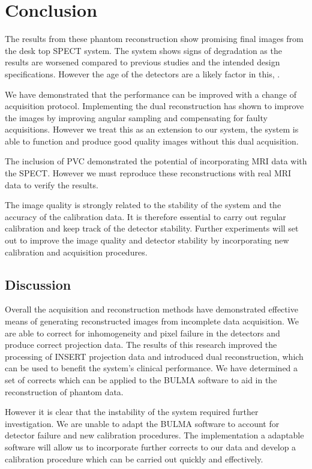 \section{Conclusion}
The results from these phantom reconstruction show promising final images from the desk top \acrshort{SPECT} system. The system shows signs of degradation as the results are worsened compared to previous studies and the intended design specifications. However the age of the detectors are a likely factor in this, \cite{Carminati2019ClinicalCharacterization}. 

We have demonstrated that the performance can be improved with a change of acquisition protocol. Implementing the dual reconstruction has shown to improve the images by improving angular sampling and compensating for faulty acquisitions. However we treat this as an extension to our system, the system is able to function and produce good quality images without this dual acquisition.

The inclusion of \acrshort{PVC} demonstrated the potential of incorporating \acrshort{MRI} data with the \acrshort{SPECT}. However we must reproduce these reconstructions with real \acrshort{MRI} data to verify the results. 

The image quality is strongly related to the stability of the system and the accuracy of the calibration data. It is therefore essential to carry out regular calibration and keep track of the detector stability. Further experiments will set out to improve the image quality and detector stability by incorporating new calibration and acquisition procedures. 

\subsection{Discussion}

Overall the acquisition and reconstruction methods have demonstrated effective means of generating reconstructed images from incomplete data acquisition. We are able to correct for inhomogeneity and pixel failure in the detectors and produce correct projection data. The results of this research improved the processing of \acrshort{INSERT} projection data and introduced dual reconstruction, which can be used to benefit the system's clinical performance. We have determined a set of corrects which can be applied to the BULMA software to aid in the reconstruction of phantom data. 

However it is clear that the instability of the system required further investigation. We are unable to adapt the BULMA software to account for detector failure and new calibration procedures. The implementation a adaptable software will allow us to incorporate further corrects to our data and develop a calibration procedure which can be carried out quickly and effectively. 

